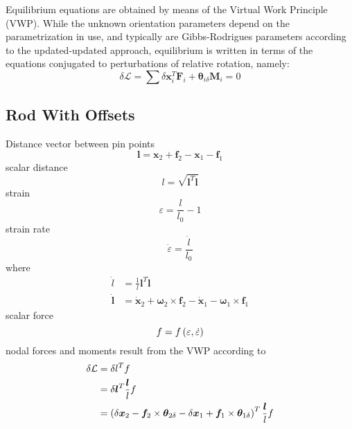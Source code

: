\documentclass[10pt,dvips,fleqn,subeqn]{report}
\newcommand{\T}[1]{\bm{#1}}
\begin{document}
Equilibrium equations are obtained by means of the Virtual Work
Principle (VWP).
While the unknown orientation parameters depend on the parametrization 
in use, and typically are Gibbs-Rodrigues parameters according 
to the updated-updated approach, equilibrium is written in terms
of the equations conjugated to perturbations of relative rotation,
namely:
\begin{equation}
	\delta\mathcal{L} = \sum \delta\T{x}_i^T \T{F}_i
	+ \T{\theta}_{i\delta} \T{M}_i = 0
\end{equation}

\subsection{Rod With Offsets}
Distance vector between pin points
\begin{equation}
	\T{l} = \T{x}_2 + \T{f}_2 - \T{x}_1 - \T{f}_1
\end{equation}
scalar distance
\begin{equation}
	l = \sqrt{\T{l}^T \T{l}}
\end{equation}
strain
\begin{equation}
	\varepsilon = \frac{l}{l_0} - 1
\end{equation}
strain rate
\begin{equation}
	\dot{\varepsilon} = \frac{\dot{l}}{l_0}
\end{equation}
where
\begin{subequations}
\begin{align}
	\dot{l} &= \frac{1}{l} \T{l}^T \dot{\T{l}} \\
	\dot{\T{l}} &= \dot{\T{x}}_2 + \T{\omega}_2 \times \T{f}_2
		- \dot{\T{x}}_1 - \T{\omega}_1 \times \T{f}_1
\end{align}
\end{subequations}
scalar force
\begin{equation}
	f = f\left( \varepsilon, \dot{\varepsilon} \right)
\end{equation}
nodal forces and moments result from the VWP according to
\begin{subequations}
\begin{align}
	\delta \mathcal{L} &= \delta l^T f \\
	&= \delta\T{l}^T \frac{\T{l}}{l} f \\
	&= \plbr{
		\delta\T{x}_2
		- \T{f}_2 \times \T{\theta}_{2\delta}
		- \delta\T{x}_1
		+ \T{f}_1 \times \T{\theta}_{1\delta}
	}^T \frac{\T{l}}{l} f
\end{align}
\end{subequations}
\end{document}
